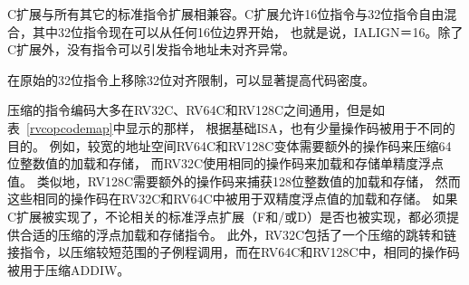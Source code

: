 C扩展与所有其它的标准指令扩展相兼容。C扩展允许16位指令与32位指令自由混合，其中32位指令现在可以从任何16位边界开始，
也就是说，IALIGN＝16。除了C扩展外，没有指令可以引发指令地址未对齐异常。

\begin{commentary}
在原始的32位指令上移除32位对齐限制，可以显著提高代码密度。
\end{commentary}

压缩的指令编码大多在RV32C、RV64C和RV128C之间通用，但是如表~\ref{rvcopcodemap}中显示的那样，
根据基础ISA，也有少量操作码被用于不同的目的。
例如，较宽的地址空间RV64C和RV128C变体需要额外的操作码来压缩64位整数值的加载和存储，
而RV32C使用相同的操作码来加载和存储单精度浮点值。
类似地，RV128C需要额外的操作码来捕获128位整数值的加载和存储，
然而这些相同的操作码在RV32C和RV64C中被用于双精度浮点值的加载和存储。
如果C扩展被实现了，不论相关的标准浮点扩展（F和/或D）是否也被实现，都必须提供合适的压缩的浮点加载和存储指令。
此外，RV32C包括了一个压缩的跳转和链接指令，以压缩较短范围的子例程调用，而在RV64C和RV128C中，相同的操作码被用于压缩ADDIW。


